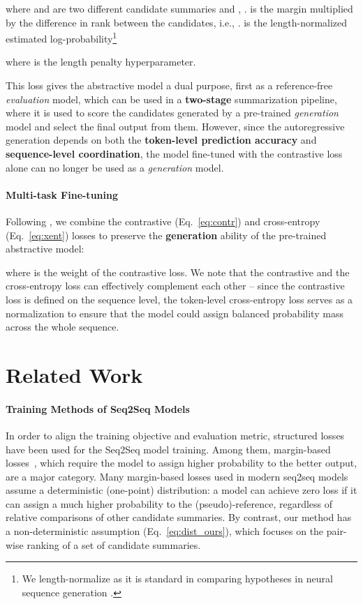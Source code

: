 \documentclass[11pt]{article}
\begin{document}
where  and  are two different candidate summaries and , .
 is the margin multiplied by the difference in rank between the candidates, i.e., . 
 is the length-normalized estimated log-probability\footnote{We length-normalize as it is standard in comparing hypotheses in neural sequence generation \citep{cho-etal-2014-properties}.}

where  is the length penalty hyperparameter.

This loss gives the abstractive model a dual purpose, first as a reference-free \textit{evaluation} model, which can be used in a \textbf{two-stage} summarization pipeline, where it is used to score the candidates generated by a pre-trained \textit{generation} model and select the final output from them. 
However, since the autoregressive generation depends on both the \textbf{token-level prediction accuracy} and \textbf{sequence-level coordination}, the model fine-tuned with the contrastive loss alone can no longer be used as a \textit{generation} model. 

\paragraph{Multi-task Fine-tuning}


Following \citet{edunov-etal-2018-classical}, we combine the contrastive (Eq.~\ref{eq:contr}) and cross-entropy (Eq.~\ref{eq:xent}) losses to preserve the \textbf{generation} ability of the pre-trained abstractive model: 

where  is the weight of the contrastive loss.
We note that the contrastive and the cross-entropy loss can effectively complement each other -- since the contrastive loss is defined on the sequence level, the token-level cross-entropy loss serves as a normalization to ensure that the model could assign balanced probability mass across the whole sequence. 

\section{Related Work}

\paragraph{Training Methods of Seq2Seq Models}
\label{subsec:training_method}
In order to align the training objective and evaluation metric, structured losses have been used for the Seq2Seq model training. 
Among them, margin-based losses~\citep{ Herbrich99supportvector, NIPS2003_878d5691, gimpel-smith-2010-softmax}, which require the model to assign higher probability to the better output, are a major category.
Many margin-based losses used in modern seq2seq models~\citep{ wiseman-rush-2016-sequence, edunov-etal-2018-classical} assume a deterministic (one-point) distribution: a model can achieve zero loss if it can assign a much higher probability to the (pseudo)-reference, regardless of relative comparisons of other candidate summaries.
By contrast, our method has a non-deterministic assumption (Eq.~\ref{eq:dist_ours}), which focuses on the pair-wise ranking of a set of candidate summaries.
\end{document}
